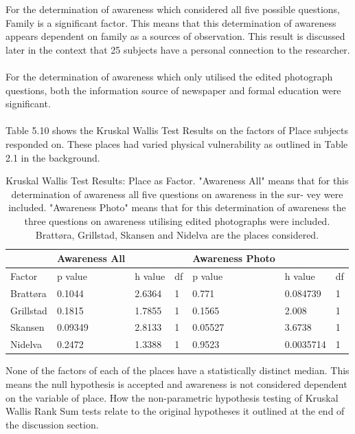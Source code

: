 For the determination of awareness which considered all five possible questions, Family is a significant factor. This means that this determination of awareness appears dependent on family as a sources of observation. This result is discussed later in the context that 25 subjects have a personal connection to the researcher.
\paragraph{}
For the determination of awareness which only utilised the edited photograph questions, both the information source of newspaper and formal education were significant.
\paragraph{}
Table 5.10 shows the Kruskal Wallis Test Results on the factors of Place subjects responded on. These places had varied physical vulnerability as outlined in Table 2.1 in the background.

\begin{table}[H]
    \centering
    \begin{tabular}{|l|l|l|l|l|l|l|}
    \hline
         ~ & \textbf{Awareness All} & ~ & ~ & \textbf{Awareness Photo} & ~ & ~ & \\ \hline
        Factor & p value & h value & df & p value & h value & df\\ \hline
         Brattøra & 0.1044  & 2.6364 & 1 & 0.771 & 0.084739 &1\\ \hline
        Grillstad & 0.1815 & 1.7855 & 1 & 0.1565 & 2.008 & 1 \\ \hline
       Skansen & 0.09349 & 2.8133 & 1 & 0.05527 & 3.6738 & 1\\ \hline
         Nidelva & 0.2472 & 1.3388 & 1 & 0.9523 &  0.0035714 & 1\\ \hline
    \end{tabular}
    \caption{Kruskal Wallis Test Results: Place as Factor.  "Awareness
All" means that for this determination of awareness all five questions on awareness in the sur-
vey were included. "Awareness Photo" means that for this determination of awareness the three
questions on awareness utilising edited photographs were included. Brattøra, Grillstad, Skansen and Nidelva are the places considered.}
\end{table}
None of the factors of each of the places have a statistically distinct median. This means the null hypothesis is accepted and awareness is not considered dependent on the variable of place. 
  How the non-parametric hypothesis testing of Kruskal Wallis Rank Sum tests relate to the original hypotheses it outlined at the end of the discussion section.   
\paragraph{}

  









